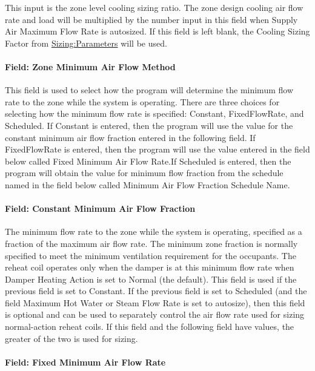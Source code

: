 This input is the zone level cooling sizing ratio. The zone design cooling air flow rate and load will be multiplied by the number input in this field when Supply Air Maximum Flow Rate is autosized. If this field is left blank, the Cooling Sizing Factor from \hyperref[sizingparameters]{Sizing:Parameters} will be used.

\paragraph{Field: Zone Minimum Air Flow Method}\label{field-zone-minimum-air-flow-method-000}

This field is used to select how the program will determine the minimum flow rate to the zone while the system is operating. There are three choices for selecting how the minimum flow rate is specified: Constant, FixedFlowRate, and Scheduled. If Constant is entered, then the program will use the value for the constant minimum air flow fraction entered in the following field. If FixedFlowRate is entered, then the program will use the value entered in the field below called Fixed Minimum Air Flow Rate.If Scheduled is entered, then the program will obtain the value for minimum flow fraction from the schedule named in the field below called Minimum Air Flow Fraction Schedule Name.

\paragraph{Field: Constant Minimum Air Flow Fraction}\label{field-constant-minimum-air-flow-fraction-000}

The minimum flow rate to the zone while the system is operating, specified as a fraction of the maximum air flow rate. The minimum zone fraction is normally specified to meet the minimum ventilation requirement for the occupants. The reheat coil operates only when the damper is at this minimum flow rate when Damper Heating Action is set to Normal (the default). This field is used if the previous field is set to Constant. If the previous field is set to Scheduled (and the field Maximum Hot Water or Steam Flow Rate is set to autosize), then this field is optional and can be used to separately control the air flow rate used for sizing normal-action reheat coils. If this field and the following field have values, the greater of the two is used for sizing.

\paragraph{Field: Fixed Minimum Air Flow Rate}\label{field-fixed-minimum-air-flow-rate-000}

